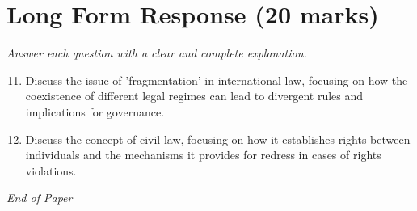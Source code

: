 \documentclass[12pt]{article}
\begin{document}
\section*{Long Form Response (20 marks)}
\textit{Answer each question with a clear and complete explanation.}
\begin{enumerate}[label=\arabic*.]
\setcounter{enumi}{10}
\item Discuss the issue of 'fragmentation' in international law, focusing on how the coexistence of different legal regimes can lead to divergent rules and implications for governance.
\item Discuss the concept of civil law, focusing on how it establishes rights between individuals and the mechanisms it provides for redress in cases of rights violations.
\end{enumerate}

\vfill
\noindent\textit{End of Paper}
\end{document}
